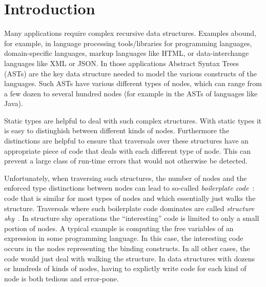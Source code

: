 \section{Introduction}

Many applications require complex recursive data structures. Examples
abound, for example, in language processing tools/libraries for programming
languages, domain-specific languages, markup languages like HTML, or
data-interchange languages like XML or JSON. In those applications
Abstract Syntax Trees (ASTs) are the key data structure needed to
model the various constructs of the languages. Such ASTs have various
different types of nodes, which can range from a few dozen to
several hundred nodes (for example in the ASTs of languages like Java).

Static types are helpful to deal with such complex structures.  With
static types it is easy to distinghish between different kinds of
nodes. Furthermore the distinctions are helpful to ensure that
traversals over these structures have an appropriate piece of code that
deals with each different type of node. This can prevent a large class
of run-time errors that would not otherwise be detected.


Unfortunately, when traversing such structures, the number of nodes and the
enforced type distinctions between nodes can lead to so-called
\emph{boilerplate code}~\cite{ralf03syb}: code that is similar for most types of nodes and which
essentially just walks the structure. Traversals where such boilerplate
code dominates are called \emph{structure shy}~\cite{DemeterBook}. In
structure shy operations the ``interesting'' code is limited to only a small portion of nodes.
A typical example is computing the free
variables of an expression in some programming language. In this
case, the interesting code occurs in the nodes representing the
binding constructs. In all other cases, the code would just deal with
walking the structure. In data structures with dozens or hundreds of
kinds of nodes, having to explictly write code for each kind of node is both tedious and error-pone.

